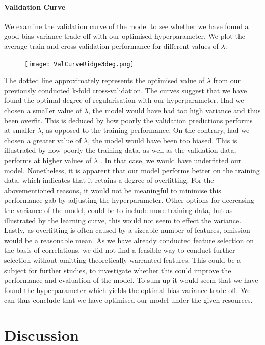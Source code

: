 \documentclass[12pt,a4paper]{article}
\begin{document}
\paragraph{Validation Curve\newline}
We examine the validation curve of the model to see whether we have found a good bias-variance trade-off with our optimised hyperparameter. We plot the average train and cross-validation performance for different values of $\lambda$: 
\begin{figure}[H]
\centering
\caption{}
\texttt{[image: ValCurveRidge3deg.png]}
\end{figure}
The dotted line approximately represents the optimised value of $\lambda$ from our previously conducted k-fold cross-validation. 
The curves suggest that we have found the optimal degree of regularisation with our hyperparameter. Had we chosen a smaller value of $\lambda$, the model would have had too high variance and thus been overfit. This is deduced by how poorly the validation predictions performs at smaller $\lambda$, as opposed to the training performance. On the contrary, had we chosen a greater value of $\lambda$, the model would have been too biased. This is illustrated by how poorly the training data, as well as the validation data, performs at higher values of $\lambda$ . In that case, we would have underfitted our model. 
Nonetheless, it is apparent that our model performs better on the training data, which indicates that it retains a degree of overfitting. For the abovementioned reasons, it would not be meaningful to minimise this performance gab by adjusting the hyperparameter. Other options for decreasing the variance of the model, could be to include more training data, but as illustrated by the learning curve, this would not seem to effect the variance. Lastly, as overfitting is often caused by a sizeable number of features, omission would be a reasonable mean. As we have already conducted feature selection on the basis of correlations, we did not find a feasible way to conduct further selection without omitting theoretically warranted features. This could be a subject for further studies, to investigate whether this could improve the performance and evaluation of the model. \newline
To sum up it would seem that we have found the hyperparameter which yields the optimal bias-variance trade-off. We can thus conclude that we have optimised our model under the given resources. 


\section{Discussion}
\end{document}
